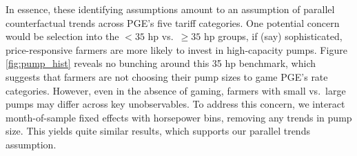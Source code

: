 In essence, these identifying assumptions amount to an assumption of parallel counterfactual trends across PGE's five tariff categories. One potential concern would be selection into the $<35$ hp vs.\ $\ge35$ hp groups, if (say) sophisticated, price-responsive farmers are more likely to invest in high-capacity pumps. Figure \ref{fig:pump_hist} reveals no bunching around this 35 hp benchmark, which suggests that farmers are not choosing their pump sizes to game PGE's rate categories. However, even in the absence of gaming, farmers with small vs.\ large pumps may differ across key unobservables. To address this concern, we interact month-of-sample fixed effects with horsepower bins, removing any trends in pump size. This yields quite similar results, which supports our parallel trends assumption.



%
%
%

